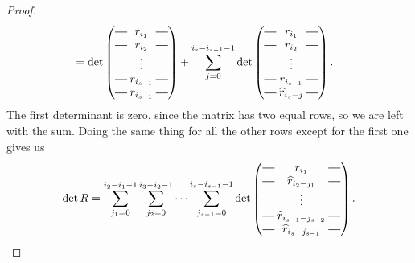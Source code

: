 \begin{proof}
\begin{align*}
            &=   \det\begin{pmatrix}
              \matrow{r_{i_1}} \\
              \matrow{r_{i_2}} \\
              & \hspace{-0.75em} \vdots & \\
              \matrow{r_{i_{s-1}}} \\
              \matrow{r_{i_{s-1}}}
            \end{pmatrix}
    + \sum_{j=0}^{i_s-i_{s-1}-1} \det\begin{pmatrix}
      \matrow{r_{i_1}} \\
      \matrow{r_{i_2}} \\
      & \hspace{-0.75em} \vdots & \\
      \matrow{r_{i_{s-1}}} \\
      \matrow{\widehat{r}_{i_s-j}} \end{pmatrix}.
  \end{align*}
  The first determinant is zero, since the matrix has two equal rows,
  so we are left with the sum. Doing the same thing for all the other
  rows except for the first one gives us
  \[ \det R = \sum_{j_1 = 0}^{i_2-i_1-1}\sum_{j_2 = 0}^{i_3-i_2-1}
  \dots \sum_{j_{s-1}=0}^{i_s-i_{s-1}-1} \det
  \begin{pmatrix}
    \matrow{r_{i_1}} \\
    \matrow{\widehat{r}_{i_2-j_1}} \\
    & \hspace{-0.75em} \vdots & \\
    \matrow{\widehat{r}_{i_{s-1}-j_{s-2}}} \\
    \matrow{\widehat{r}_{i_s-j_{s-1}}}
  \end{pmatrix}. \]
  

\end{proof}
